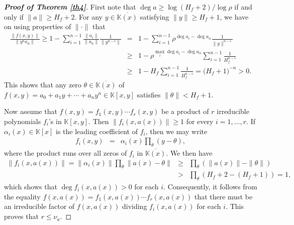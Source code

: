 \documentclass[10pt,a4paper]{amsart}
\newcommand{\K}{\mathbb{K}}
\begin{document}
\begin{proof}[\bf Proof of Theorem \ref{th4}] First note that $\deg a\geq  \log (H_f+2)/\log \rho$ if and only if $\|a\|\geq H_f+2$.  For any $y\in \overline{\K(x)}$ satisfying $\|y\|\geq H_f+1$, we have on using properties of $\|\cdot\|$ that
\begin{eqnarray*}
\frac{\|f(x,y)\|}{\|y^n a_n\|} \geq 1-\sum_{i=1}^{n-1}\frac{\|a_i\|}{\|a_n\|}\frac{1}{\|y^{n-i}\|}
 &= & 1-\sum_{i=1}^{n-1}\rho^{\deg a_i-\deg a_n}\frac{1}{\|y\|^{n-i}}\\
 &\geq & 1-\rho^{\max_{i}\deg a_i-\deg a_n}\sum_{i=1}^{n-1}\frac{1}{H_f^{n-i}}\\
   &\geq & 1-H_f\sum_{i=1}^{n-1}\frac{1}{H_f^{n-i}}= \bigl(H_f+1\bigr)^{-n}>0.
\end{eqnarray*}
This shows that any zero $\theta\in \overline{\K(x)}$ of $f(x,y)=a_0+a_1 y+\cdots+a_ny^n\in \K[x,y]$ satisfies $\|\theta\|<H_f+1$.

Now assume that $f(x,y)=f_1(x,y)\cdots f_r(x,y)$ be a product of $r$ irreducible polynomials $f_i$'s in $\K[x,y]$. Then $\|f_i(x,a(x))\|\geq 1$ for every $i=1,\ldots,r$. If $\alpha_i(x)\in \K[x]$ is the leading coefficient of $f_i$, then we may write
\begin{eqnarray*}
f_i(x,y) &=& \alpha_i(x)\prod_{\theta} (y-\theta),
\end{eqnarray*}
where the product runs over all zeros of $f_i$ in $\overline{\K(x)}$. We then have
\begin{eqnarray*}
\|f_i(x,a(x))\| = \|\alpha_i(x)\|\prod_{\theta} \|a(x)-\theta\|&\geq& \prod_{\theta} (\|a(x)\|-\|\theta\|)\\
&>& \prod_{\theta} (H_f+2-(H_f+1))=1,
\end{eqnarray*}
which shows that $\deg f_i(x,a(x))>0$ for each $i$. Consequently, it follows from the equality $f(x,a(x))=f_1(x,a(x))\cdots f_r(x,a(x))$ that there must be an irreducible factor of $f(x,a(x))$  dividing $f_i(x,a(x))$ for each $i$. This proves that $r\leq \nu_a$.
\end{proof}
\end{document}
